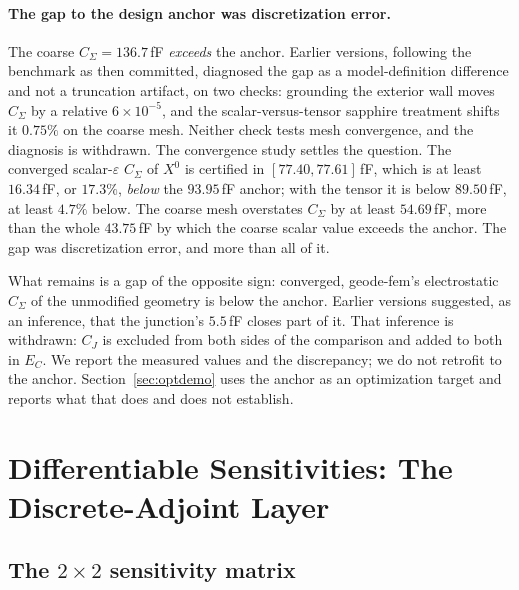 \documentclass{anvil-paper}
\begin{document}
\paragraph{The gap to the design anchor was discretization error.}
The coarse $C_\Sigma = 136.7$\,fF \emph{exceeds} the anchor.
Earlier versions, following the benchmark as then committed, diagnosed
the gap as a model-definition difference and not a truncation artifact,
on two checks: grounding the exterior wall moves $C_\Sigma$ by a
relative $6\times10^{-5}$, and the scalar-versus-tensor sapphire
treatment shifts it $0.75\%$ on the coarse mesh. Neither check tests
mesh convergence, and the diagnosis is withdrawn. The convergence study
settles the question. The converged scalar-$\varepsilon$ $C_\Sigma$ of
$X^0$ is certified in $[77.40, 77.61]$\,fF, which is at least
$16.34$\,fF, or $17.3\%$, \emph{below} the $93.95$\,fF anchor; with the
tensor it is below $89.50$\,fF, at least $4.7\%$ below. The coarse mesh
overstates $C_\Sigma$ by at least $54.69$\,fF, more than the whole
$43.75$\,fF by which the coarse scalar value exceeds the anchor. The gap
was discretization error, and more than all of it.

What remains is a gap of the opposite sign: converged, geode-fem's
electrostatic $C_\Sigma$ of the unmodified geometry is below the anchor.
Earlier versions suggested, as an inference, that the junction's
$5.5$\,fF closes part of it. That inference is withdrawn: $C_J$ is
excluded from both sides of the comparison and added to both in $E_C$.
We report the measured values and the discrepancy; we do not retrofit
to the anchor. Section~\ref{sec:optdemo} uses the anchor as an
optimization target and reports what that does and does not establish.

\section{Differentiable Sensitivities: The Discrete-Adjoint Layer}
\label{sec:adjoint}

\subsection{The \texorpdfstring{$2\times 2$}{2x2} sensitivity matrix}
\label{sec:adjoint-matrix}
\end{document}
